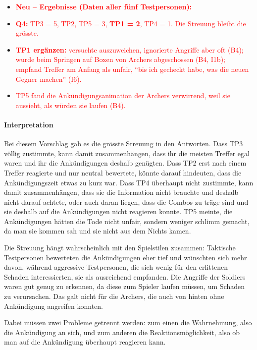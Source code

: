 \documentclass[../Main.tex]{subfiles}
\begin{document}
\begin{itemize}[leftmargin=1.5cm]
    \item \textcolor{red}{\textbf{Neu -- Ergebnisse (Daten aller fünf Testpersonen):}}
    \item \textcolor{red}{\textbf{Q4:} TP3 = 5, TP2, TP5 = 3, \textbf{TP1 = 2}, TP4 = 1. Die Streuung bleibt die grösste.}
    \item \textcolor{red}{\textbf{TP1 ergänzen:} versuchte auszuweichen, ignorierte Angriffe aber oft (B4); wurde beim Springen auf Boxen von Archers abgeschossen (B4, I1b); empfand Treffer am Anfang als unfair, \enquote{bis ich gecheckt habe, was die neuen Gegner machen} (I6).}
    \item \textcolor{red}{TP5 fand die Ankündigungsanimation der Archers verwirrend, weil sie aussieht, als würden sie laufen (B4).}
\end{itemize}

\paragraph{Interpretation}
Bei diesem Vorschlag gab es die grösste Streuung in den Antworten. Dass TP3 völlig zustimmte, kann damit zusammenhängen, dass ihr die meisten Treffer egal waren und ihr die Ankündigungen deshalb genügten. Dass TP2 erst nach einem Treffer reagierte und nur neutral bewertete, könnte darauf hindeuten, dass die Ankündigungszeit etwas zu kurz war. Dass TP4 überhaupt nicht zustimmte, kann damit zusammenhängen, dass sie die Information nicht brauchte und deshalb nicht darauf achtete, oder auch daran liegen, dass die Combos zu träge sind und sie deshalb auf die Ankündigungen nicht reagieren konnte. TP5 meinte, die Ankündigungen hätten die Tode nicht unfair, sondern weniger schlimm gemacht, da man sie kommen sah und sie nicht aus dem Nichts kamen.

Die Streuung hängt wahrscheinlich mit den Spielstilen zusammen: Taktische Testpersonen bewerteten die Ankündigungen eher tief und wünschten sich mehr davon, während aggressive Testpersonen, die sich wenig für den erlittenen Schaden interessierten, sie als ausreichend empfanden. Die Angriffe der Soldiers waren gut genug zu erkennen, da diese zum Spieler laufen müssen, um Schaden zu verursachen. Das galt nicht für die Archers, die auch von hinten ohne Ankündigung angreifen konnten.

Dabei müssen zwei Probleme getrennt werden: zum einen die Wahrnehmung, also die Ankündigung an sich, und zum anderen die Reaktionsmöglichkeit, also ob man auf die Ankündigung überhaupt reagieren kann.
\end{document}

